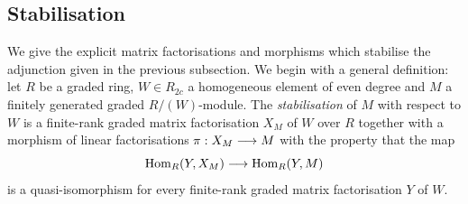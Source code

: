 \documentclass{compositio}
\theoremstyle{definition}
\numberwithin{equation}{section}
\def\Hom{\operatorname{Hom}}
\begin{document}

\subsection{Stabilisation}\label{section:stabilisation}

We give the explicit matrix factorisations and morphisms which stabilise the adjunction given in the previous subsection. We begin with a general definition: let $R$ be a graded ring, $W \in R_{2c}$ a homogeneous element of even degree and $M$ a finitely generated graded $R/(W)$-module. The \emph{stabilisation} of $M$ with respect to $W$ is a finite-rank graded matrix factorisation $X_M$ of $W$ over $R$ together with a morphism of linear factorisations $\pi: X_M \longrightarrow M$ with the property that the map
\[
\Hom_R(Y, X_M) \lto \Hom_R(Y, M)
\]
is a quasi-isomorphism for every finite-rank graded matrix factorisation $Y$ of $W$.

\end{document}
